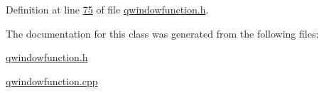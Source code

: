Definition at line \hyperlink{a00128_source_l00075}{75} of file \hyperlink{a00128_source}{qwindowfunction.\+h}.



The documentation for this class was generated from the following files\+:\begin{DoxyCompactItemize}
\item 
\hyperlink{a00128}{qwindowfunction.\+h}\item 
\hyperlink{a00127}{qwindowfunction.\+cpp}\end{DoxyCompactItemize}
